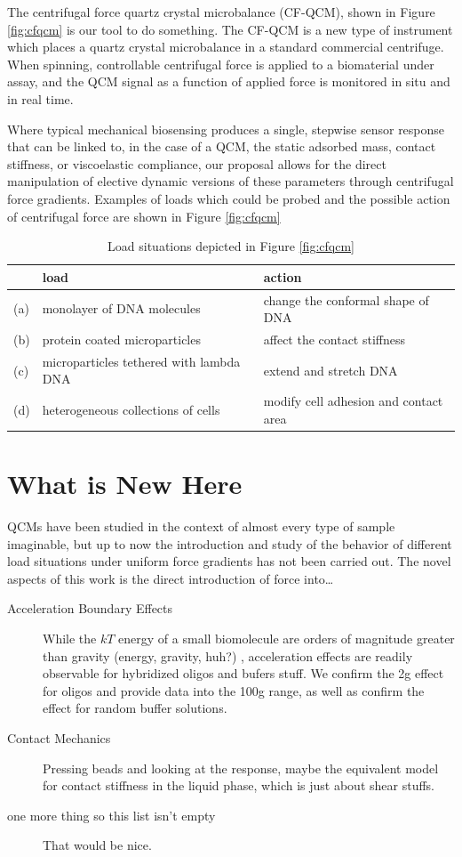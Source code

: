 \documentclass[a4paper,titlepage,onecolumn]{report}
\newcommand{\Figure}[1]{Figure \ref{#1}}
\begin{document}
The centrifugal force quartz crystal microbalance (CF-QCM), shown in
\Figure{fig:cfqcm} is our tool to do something.  The CF-QCM is a new type
of instrument which places a quartz crystal microbalance in a standard
commercial centrifuge.  When spinning, controllable centrifugal force is
applied to a biomaterial under assay, and the QCM signal as a function of
applied force is monitored in situ and in real time.

Where typical mechanical biosensing produces a single, stepwise sensor
response that can be linked to, in the case of a QCM, the static adsorbed
mass, contact stiffness, or viscoelastic compliance, our proposal allows
for the direct manipulation of elective dynamic versions of these
parameters through centrifugal force gradients.
Examples of loads which could be probed and the possible action of
centrifugal force are shown in \Figure{fig:cfqcm}
\begin{table}
 \centering
\begin{tabular}{lll}
\toprule
& load & action\\
\midrule
(a)& monolayer of DNA molecules& change the conformal shape of DNA\\
(b)& protein coated microparticles& affect the contact stiffness\\
(c)& microparticles tethered with lambda DNA& extend and stretch DNA\\
(d)& heterogeneous collections of cells& modify cell adhesion and contact area\\
\bottomrule
\end{tabular}
\caption{Load situations depicted in \Figure{fig:cfqcm}}
\end{table}

\section{What is New Here}
QCMs have been studied in the context of almost every type of sample
imaginable, but up to now the introduction and study of the behavior of
different load situations under uniform force gradients has not been
carried out.
The novel aspects of this work is the direct introduction of force
into\dots

\begin{description}
\item[{Acceleration Boundary Effects}] While the $kT$ energy of a
small biomolecule are orders of magnitude greater than gravity (energy,
gravity, huh?)
, acceleration effects are readily observable for hybridized
oligos and bufers stuff.  We confirm the 2g effect for oligos and provide
data into the 100g range, as well as confirm the effect for random buffer
solutions.
\item[{Contact Mechanics}] Pressing beads and looking at the response,
 maybe the equivalent model for contact stiffness in the liquid phase,
 which is just about shear stuffs.
\item[{one more thing so this list isn't empty}] That would be nice.
\end{description}
\end{document}
